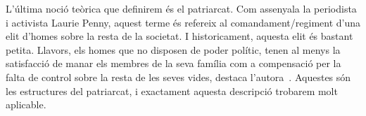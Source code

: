 L'última noció teòrica que definirem és el patriarcat.
Com assenyala la periodista i activista Laurie Penny, aquest terme és refereix al comandament/regiment d'una elit d'homes sobre la resta de la societat.
I historicament, aquesta elit és bastant petita.
Llavors, els homes que no disposen de poder polític, tenen al menys la satisfacció de manar els membres de la seva família com a compensació per la falta de control sobre la resta de les seves vides, destaca l'autora~\autocite[69-70]{Penny2014}.
Aquestes són les estructures del patriarcat, i exactament aquesta descripció trobarem molt aplicable.

\begin{comment}
Autoidentificació - religió
---------------------------
Kapitel Estima Déu i ell t'estimarà
- Identitaetssuche
- Ohne vernuenftige Vorbilder + Erklaerung, ohne Sinn und Verstand
- Escaipismus
- zu Extremhaltungen neigend
- sich aufgehoben fuehlen
"Jo em vaig proposar de ser una bona musulmana, la millor." (p.226)

"Déu meu, fes que el pare torni al bon camí, però ho deia en la llengua de la capital de comarca perquè en la llegua dels musulmans jo no hauria sabut com dir-ho. S'hi valia: en l'última part de l'oració, on demanes alguna cosa directament a Déu, podies fer servir la llenuga que et fos més còmoda." (p.226)
-- llengua-idenitat

Hijab
-----
quote Interview El Hachmi:
"Los pornógrafos de la etnicidad acentúan rasgos de ti que en tu país encontrarías ridículos."
"El inmigrante no quiere pertenecer a una asociación de inmigrantes, sino a una de vecinos..."
"Cada mujer lleva el velo por motivos diferentes. Y no se
puede pretender salvar, de manera paternalista, a las pobres moritas del yugo de
sus maridos.
-El yugo existe.
—Como en otras culturas."
"El problema es que la mayoría tiene permiso de residencia sin permiso de trabajo. La ley de extranjería las condena a la clandestinidad laboral y eso hace que dependan del marido. Les corta la vía de emancipación."

"Treu-te això del cap, que em fas passar vergonya. I ella que no, que em sentiré despullada, que no. Mira que aquí les coses són diferents i a mi em coneix molta gent i tinc una empresa i no hi ha cap nexessitat de portar aquests draps." (p. 183)
-- der stellt sich sehr befreit und so dar; und spaeter findet er gut, dass seine tochter nen hijab traegt..

"Me'l posava per resar, primer. Després per estar per casa. FIns que vaig sentir que era imprescindible, que no podria viure mai més passant amb el cap descobert davant de ningú. Me'l vaig posar per anar a comprar i vaig sentir les mirades estranyades de les botigueres que em coneixien [...] Vaig sortir així un parell de vegades i un dia el pare em va veure. [...] Au, no surtis més amb aquest drap al cap." (p.228)
-- warum gucken sie die Verkaeuferinnen komisch an? ist sie etwa nicht dieselbe person? was sehen sie im hijab? ein symbol der anderen? ein symbol der opression?


\end{comment}
